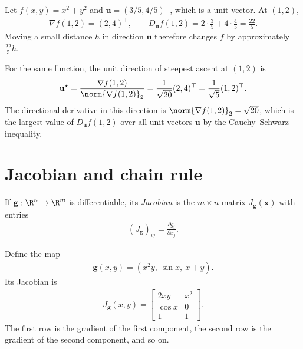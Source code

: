 \documentclass[a4paper, 12pt]{book}
\begin{document}
\begin{example}
    Let $f(x,y)=x^2+y^2$ and $\mathbf{u}=(3/5,4/5)^\top$, which is a unit vector.
    At $(1,2)$,
    \begin{align}
        \nabla f(1,2) = (2,4)^\top,
        \qquad
        D_{\mathbf{u}}f(1,2) = 2\cdot\frac35 + 4\cdot\frac45 = \frac{22}{5}.
    \end{align}
    Moving a small distance $h$ in direction $\mathbf{u}$ therefore changes $f$ by
    approximately $\frac{22}{5}h$.
\end{example}

\begin{example}
    For the same function, the unit direction of steepest ascent at $(1,2)$ is
    \begin{align}
        \mathbf{u}^\star = \frac{\nabla f(1,2)}{\norm{\nabla f(1,2)}_2}
        = \frac{1}{\sqrt{20}}(2,4)^\top = \frac{1}{\sqrt5}(1,2)^\top.
    \end{align}
    The directional derivative in this direction is
    $\norm{\nabla f(1,2)}_2=\sqrt{20}$, which is the largest value of
    $D_{\mathbf{u}}f(1,2)$ over all unit vectors $\mathbf{u}$ by the
    Cauchy--Schwarz inequality.
\end{example}



\section{Jacobian and chain rule}

If $\mathbf{g} : \R^n \to \R^m$ is differentiable, its \emph{Jacobian} is the $m \times n$ matrix $J_{\mathbf{g}}(\mathbf{x})$ with entries
\begin{align}
    (J_{\mathbf{g}})_{ij} = \frac{\partial g_i}{\partial x_j}.
\end{align}
\begin{example}
    Define the map
    \begin{align}
        \mathbf{g}(x,y) = (x^2y,\ \sin x,\ x+y).
    \end{align}
    Its Jacobian is
    \begin{align}
        J_{\mathbf{g}}(x,y) =
        \begin{bmatrix}
            2xy & x^2\\
            \cos x & 0\\
            1 & 1
        \end{bmatrix}.
    \end{align}
    The first row is the gradient of the first component, the second row is the
    gradient of the second component, and so on.
\end{example}
\end{document}
